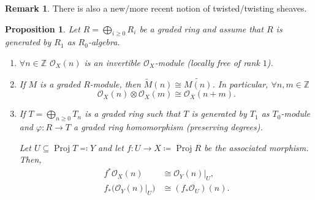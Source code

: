 \documentclass[12pt]{article}
\DeclareMathOperator{\Proj}{Proj}
\newtheorem*{proposition}{Proposition}
\theoremstyle{definition}
\newtheorem*{remark}{Remark}
\begin{document}
\begin{remark}
There is also a new/more recent notion of twisted/twisting sheaves.
\end{remark}

\begin{proposition}
Let $R=\bigoplus_{i\geq0}R_i$ be a graded ring and assume that $R$ is generated by $R_1$ as $R_0$-algebra.

\begin{enumerate}[label=\arabic*)]
\item $\forall n\in\mathbb{Z}$ $\mathcal{O}_X(n)$ is an invertible $\mathcal{O}_X$-module (locally free of rank $1$).

\item If $M$ is a graded $R$-module, then $\widetilde{M}(n)\cong\widetilde{M(n)}$. In particular, $\forall n,m\in\mathbb{Z}$
\[\mathcal{O}_X(n)\otimes\mathcal{O}_X(m)\cong\mathcal{O}_X(n+m).\]

\item If $T=\bigoplus_{n\geq0}T_n$ is a graded ring such that $T$ is generated by $T_1$ as $T_0$-module and $\varphi:R\rightarrow T$ a graded ring homomorphism (preserving degrees).

Let $U\subseteq\Proj T\eqqcolon Y$ and let $f:U\rightarrow X\coloneqq\Proj R$ be the associated morphism. Then,
\begin{align*}
f^*\mathcal{O}_X(n)&\cong\mathcal{O}_Y(n)|_U,\\
f_*\big(\mathcal{O}_Y(n)|_U\big)&\cong(f_*\mathcal{O}_U)(n).
\end{align*}
\end{enumerate}
\end{proposition}
\end{document}
